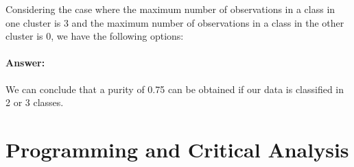 \documentclass{article}
\begin{document}
Considering the case where the maximum number of observations in a class in one cluster is 3 and the maximum number of observations in a class in the other cluster is 0, we have the following options:

\begin{center}
\end{center}


\paragraph{Answer:} We can conclude that a purity of 0.75 can be obtained if our data is classified in 2 or 3 classes.

\newpage

\section*{Programming and Critical Analysis}
\end{document}
